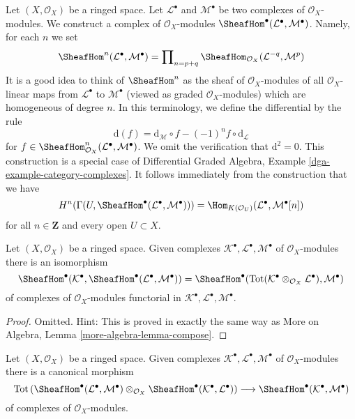 \noindent
Let $(X, \mathcal{O}_X)$ be a ringed space. Let
$\mathcal{L}^\bullet$ and $\mathcal{M}^\bullet$ be two complexes
of $\mathcal{O}_X$-modules. We construct a complex
of $\mathcal{O}_X$-modules
$\SheafHom^\bullet(\mathcal{L}^\bullet, \mathcal{M}^\bullet)$.
Namely, for each $n$ we set
$$
\SheafHom^n(\mathcal{L}^\bullet, \mathcal{M}^\bullet) =
\prod\nolimits_{n = p + q}
\SheafHom_{\mathcal{O}_X}(\mathcal{L}^{-q}, \mathcal{M}^p)
$$
It is a good idea to think of $\SheafHom^n$ as the
sheaf of $\mathcal{O}_X$-modules of all $\mathcal{O}_X$-linear
maps from $\mathcal{L}^\bullet$ to $\mathcal{M}^\bullet$
(viewed as graded $\mathcal{O}_X$-modules) which are homogeneous
of degree $n$. In this terminology, we define the differential by the rule
$$
\text{d}(f) =
\text{d}_\mathcal{M} \circ f - (-1)^n f \circ \text{d}_\mathcal{L}
$$
for
$f \in \SheafHom^n_{\mathcal{O}_X}(\mathcal{L}^\bullet, \mathcal{M}^\bullet)$.
We omit the verification that $\text{d}^2 = 0$.
This construction is a special case of
Differential Graded Algebra, Example \ref{dga-example-category-complexes}.
It follows immediately from the construction that we have
\begin{equation}
\label{equation-cohomology-hom-complex}
H^n(\Gamma(U, \SheafHom^\bullet(\mathcal{L}^\bullet, \mathcal{M}^\bullet))) =
\Hom_{K(\mathcal{O}_U)}(\mathcal{L}^\bullet, \mathcal{M}^\bullet[n])
\end{equation}
for all $n \in \mathbf{Z}$ and every open $U \subset X$.

\begin{lemma}
\label{lemma-compose}
Let $(X, \mathcal{O}_X)$ be a ringed space.
Given complexes $\mathcal{K}^\bullet, \mathcal{L}^\bullet, \mathcal{M}^\bullet$
of $\mathcal{O}_X$-modules there is an isomorphism
$$
\SheafHom^\bullet(\mathcal{K}^\bullet,
\SheafHom^\bullet(\mathcal{L}^\bullet, \mathcal{M}^\bullet))
=
\SheafHom^\bullet(\text{Tot}(\mathcal{K}^\bullet \otimes_{\mathcal{O}_X}
\mathcal{L}^\bullet), \mathcal{M}^\bullet)
$$
of complexes of $\mathcal{O}_X$-modules functorial in
$\mathcal{K}^\bullet, \mathcal{L}^\bullet, \mathcal{M}^\bullet$.
\end{lemma}

\begin{proof}
Omitted. Hint: This is proved in exactly the same way as
More on Algebra, Lemma \ref{more-algebra-lemma-compose}.
\end{proof}

\begin{lemma}
\label{lemma-composition}
Let $(X, \mathcal{O}_X)$ be a ringed space. Given complexes
$\mathcal{K}^\bullet, \mathcal{L}^\bullet, \mathcal{M}^\bullet$
of $\mathcal{O}_X$-modules there is a canonical morphism
$$
\text{Tot}\left(
\SheafHom^\bullet(\mathcal{L}^\bullet, \mathcal{M}^\bullet)
\otimes_{\mathcal{O}_X}
\SheafHom^\bullet(\mathcal{K}^\bullet, \mathcal{L}^\bullet)
\right)
\longrightarrow
\SheafHom^\bullet(\mathcal{K}^\bullet, \mathcal{M}^\bullet)
$$
of complexes of $\mathcal{O}_X$-modules.
\end{lemma}


